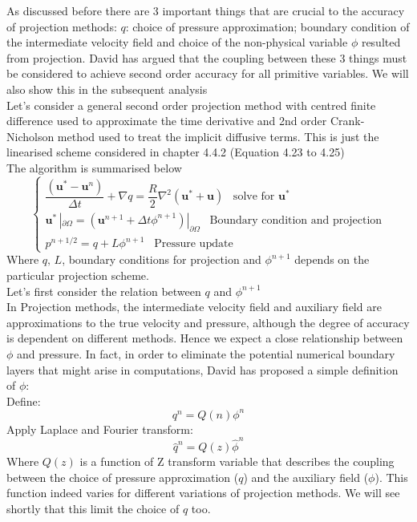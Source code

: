 As discussed before there are 3 important things that are crucial to the accuracy of projection methods: $q$: choice of pressure approximation; boundary condition of the intermediate velocity field and choice of the non-physical variable $\phi$ resulted from projection. David has argued that the coupling between these 3 things must be considered to achieve second order accuracy for all primitive variables. We will also show this in the subsequent analysis \cite{brown2001accurate}\\

Let's consider a general second order projection method with centred finite difference used to approximate the time derivative and 2nd order Crank-Nicholson method used to treat the implicit diffusive terms. This is just the linearised scheme considered in chapter 4.4.2 (Equation 4.23 to 4.25)\\

The algorithm is summarised below\\
\begin{equation}
\begin{cases}
\dfrac{(\textbf{u}^* - \textbf{u}^n)}{\Delta t} + \nabla q = \dfrac{R}{2} \nabla^2 (\textbf{u}^* + \textbf{u})\,\,\,\text{   solve for $\textbf{u}^*$}\\
\textbf{u}^* \,|_{\partial \Omega}= \left(\textbf{u}^{n+1} + \Delta t \phi^{n+1}\right)|_{\partial \Omega}\,\,\,\text{   Boundary condition and projection}\\
p^{n+1/2} = q + L \phi^{n+1}\,\,\,\text{   Pressure update}
\end{cases}
\end{equation}
Where $q, \,L$, boundary conditions for projection and $\phi^{n+1}$ depends on the particular projection scheme.\\

Let's first consider the relation between $q$ and $\phi^{n+1}$\\
In Projection methods, the intermediate velocity field and auxiliary field are approximations to the true velocity and pressure, although the degree of accuracy is dependent on different methods. Hence we expect a close relationship between $\phi$ and pressure. In fact, in order to eliminate the potential numerical boundary layers that might arise in computations, David has proposed a simple definition of $\phi$:\\
Define:
\begin{equation*}
q^n = Q(n) \phi^n
\end{equation*}
Apply Laplace and Fourier transform:
\begin{equation}
\hat{q}^n = Q(z) \hat{\phi}^n
\end{equation}
Where $Q(z)$ is a function of Z transform variable that describes the coupling between the choice of pressure approximation ($q$) and the auxiliary field ($\phi$). This function indeed varies for different variations of projection methods. We will see shortly that this limit the choice of $q$ too.\\

